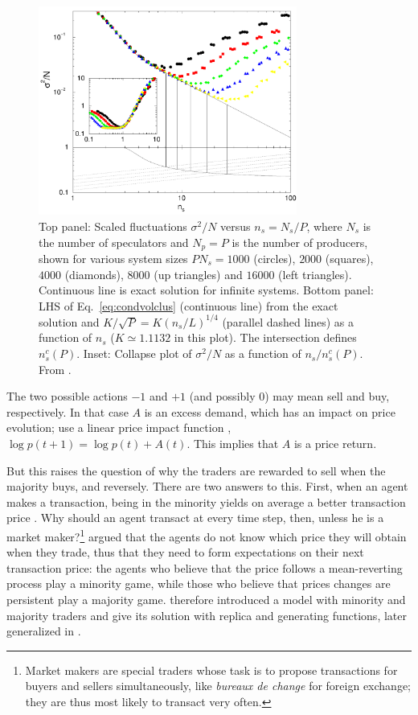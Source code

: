 \documentclass[aps,twocolumn,nofootinbib,sortedaddress,reprint]{revtex4-1}
\begin{document}
\begin{figure}
\includegraphics*[width=8.5cm]{fig4.pdf}
\caption{\label{fig:gcmg_signalnoise} Top panel: Scaled fluctuations
  $\sigma^2/N$ versus $n_s=N_s/P$, where $N_s$ is the number of
  speculators and $N_p=P$ is the number of producers, shown for
  various system sizes $PN_s=1000$ (circles), $2000$ (squares),
$4000$ (diamonds), $8000$ (up triangles) and $16000$ (left triangles).
Continuous line is exact solution for infinite systems.
Bottom panel:  LHS of Eq.~\eqref{eq:condvolclus} (continuous line) from
the exact solution and $K/\sqrt{P}=K(n_s/L)^{1/4}$ (parallel dashed
lines) as a function of $n_s$ ($K\simeq 1.1132$ in this plot).
The intersection defines $n_s^c(P)$. Inset: Collapse plot of
$\sigma^2/N$ as a function of $n_s/n_s^c(P)$.
  From \textcite{CM03}.}
\end{figure}

The two possible actions $-1$ and $+1$ (and possibly $0$) may mean sell and
buy, respectively. In that case $A$ is an excess demand, which has an
impact on price evolution; \textcite{J00} use a linear price impact
function \cite{FarmerImpact,ContBouchaud}, $\log p(t+1)=\log
p(t)+A(t)$. This implies that $A$ is a price return.

But this raises the question of why the traders are rewarded to sell
when the majority buys, and reversely. There are two answers to
this. First, when an agent makes a transaction, being in the minority
yields on average a better transaction price \cite{MGbook}. Why should
an agent transact at every time step, then, unless he is a market
maker?\footnote{Market makers are special traders whose task is to
  propose transactions for buyers and sellers simultaneously, like
  {\em bureaux de change} for foreign exchange; they are thus most
  likely to transact very often.} \textcite{MarsiliMinMaj} argued that
the agents do not know which price they will obtain when they trade,
thus that they need to form expectations on their next transaction price:
the agents who believe that the price follows a mean-reverting process
play a minority game, while those who believe that prices changes are
persistent play a majority game. \textcite{deMGM03} therefore
introduced a model with minority and majority traders and give its
solution with replica and generating functions, later generalized in
\textcite{papadopoulos2009theory}.
\end{document}
